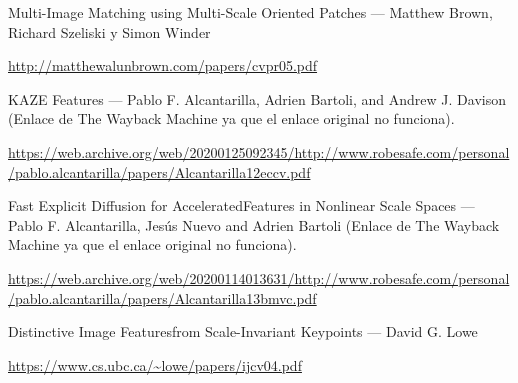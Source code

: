 \documentclass[12pt, spanish]{article}
\begin{document}
\begin{thebibliography}{9}


		Multi-Image Matching using Multi-Scale Oriented Patches --- Matthew Brown, Richard Szeliski y Simon Winder

		\url{http://matthewalunbrown.com/papers/cvpr05.pdf}


		KAZE Features --- Pablo F. Alcantarilla, Adrien Bartoli, and Andrew J. Davison (Enlace de The Wayback Machine ya que el enlace original no funciona).

		\url{https://web.archive.org/web/20200125092345/http://www.robesafe.com/personal/pablo.alcantarilla/papers/Alcantarilla12eccv.pdf}


		Fast Explicit Diffusion for AcceleratedFeatures in Nonlinear Scale Spaces --- Pablo F. Alcantarilla, Jesús Nuevo and Adrien Bartoli (Enlace de The Wayback Machine ya que el enlace original no funciona).

		\url{https://web.archive.org/web/20200114013631/http://www.robesafe.com/personal/pablo.alcantarilla/papers/Alcantarilla13bmvc.pdf}



		Distinctive Image Featuresfrom Scale-Invariant Keypoints --- David G. Lowe

		\url{https://www.cs.ubc.ca/~lowe/papers/ijcv04.pdf}


\end{thebibliography}
\end{document}
